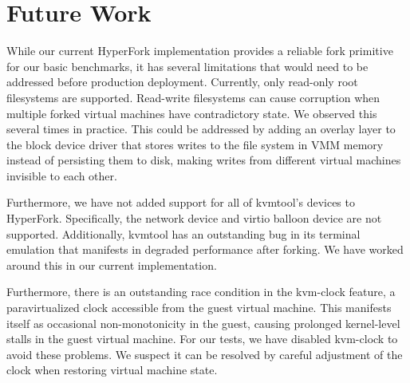 \section{Future Work}

 While our current HyperFork implementation provides a
reliable fork primitive for our basic benchmarks, it has several limitations
that would need to be addressed before production deployment. Currently, only
read-only root filesystems are supported. Read-write filesystems can cause
corruption when multiple forked virtual machines have contradictory state. We
observed this several times in practice. This could be addressed by adding an
overlay layer to the block device driver that stores writes to the file system
in VMM memory instead of persisting them to disk, making writes from different
virtual machines invisible to each other.

Furthermore, we have not added support for all of kvmtool's devices to
HyperFork. Specifically, the network device and virtio balloon device are not
supported. Additionally, kvmtool has an outstanding bug in its terminal
emulation that manifests in degraded performance after forking. We have worked
around this in our current implementation.

Furthermore, there is an outstanding race condition in the kvm-clock feature, a
paravirtualized clock accessible from the guest virtual machine. This manifests
itself as occasional non-monotonicity in the guest, causing prolonged
kernel-level stalls in the guest virtual machine. For our tests, we have
disabled kvm-clock to avoid these problems. We suspect it can be resolved by
careful adjustment of the clock when restoring virtual machine state.


